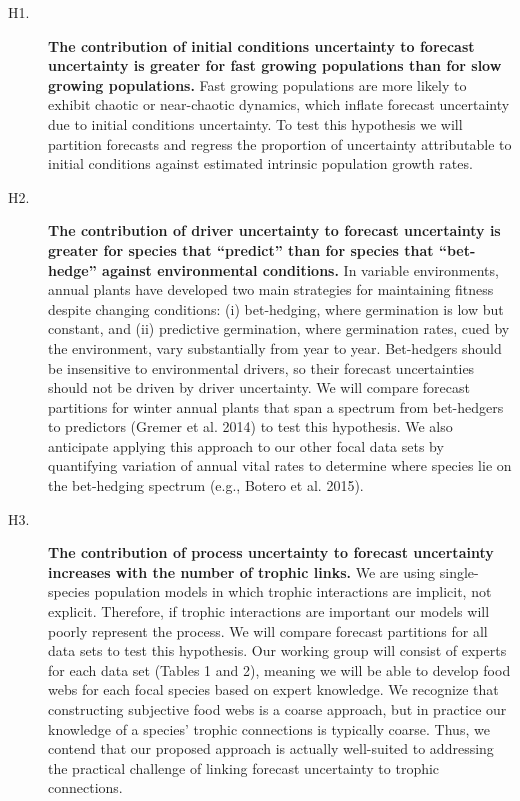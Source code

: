 \documentclass[12pt,]{article}
\begin{document}
\begin{description}

\item[H1.] \textbf{The contribution of initial conditions uncertainty to forecast uncertainty is greater for fast growing populations than for slow growing populations.} Fast growing populations are more likely to exhibit chaotic or near-chaotic dynamics, which inflate forecast uncertainty due to initial conditions uncertainty. To test this hypothesis we will partition forecasts and regress the proportion of uncertainty attributable to initial conditions against estimated intrinsic population growth rates.

\item[H2.] \textbf{The contribution of driver uncertainty to forecast uncertainty is greater for species that ``predict'' than for species that ``bet-hedge'' against environmental conditions.} In variable environments, annual plants have developed two main strategies for maintaining fitness despite changing conditions: (i) bet-hedging, where germination is low but constant, and (ii) predictive germination, where germination rates, cued by the environment, vary substantially from year to year. Bet-hedgers should be insensitive to environmental drivers, so their forecast uncertainties should not be driven by driver uncertainty. We will compare forecast partitions for winter annual plants that span a spectrum from bet-hedgers to predictors (Gremer et al. 2014) to test this hypothesis. We also anticipate applying this approach to our other focal data sets by quantifying variation of annual vital rates to determine where species lie on the bet-hedging spectrum (e.g., Botero et al. 2015).

\item[H3.] \textbf{The contribution of process uncertainty to forecast uncertainty increases with the number of trophic links.} We are using single-species population models in which trophic interactions are implicit, not explicit. Therefore, if trophic interactions are important our models will poorly represent the process. We will compare forecast partitions for all data sets to test this hypothesis. Our working group will consist of experts for each data set (Tables 1 and 2), meaning we will be able to develop food webs for each focal species based on expert knowledge. We recognize that constructing subjective food webs is a coarse approach, but in practice our knowledge of a species' trophic connections is typically coarse. Thus, we contend that our proposed approach is actually well-suited to addressing the practical challenge of linking forecast uncertainty to trophic connections.

\end{description}
\end{document}
